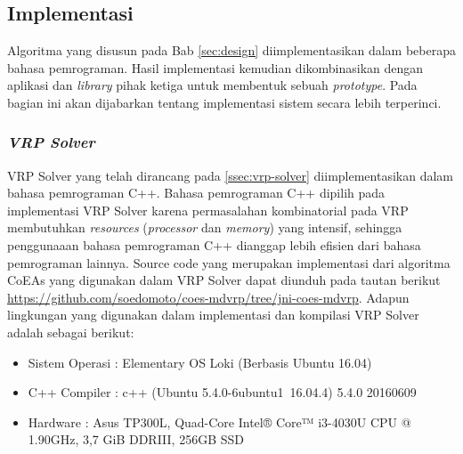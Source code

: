 \chapter{\babLima}


\section{Implementasi}
\label{sec:implementation}
Algoritma yang disusun pada Bab \ref{sec:design} diimplementasikan dalam beberapa bahasa pemrograman. Hasil implementasi kemudian dikombinasikan dengan aplikasi dan \textit{library} pihak ketiga untuk membentuk sebuah \textit{prototype}. Pada bagian ini akan dijabarkan tentang implementasi sistem secara lebih terperinci.


\subsection{\textit{VRP Solver}}
VRP Solver yang telah dirancang pada \autoref{ssec:vrp-solver} diimplementasikan dalam bahasa pemrograman C++. Bahasa pemrograman C++ dipilih pada implementasi VRP Solver karena permasalahan kombinatorial pada VRP membutuhkan \textit{resources} (\textit{processor} dan \textit{memory}) yang intensif, sehingga penggunaaan bahasa pemrograman C++ dianggap lebih efisien dari bahasa pemrograman lainnya. Source code yang merupakan implementasi dari algoritma CoEAs yang digunakan dalam VRP Solver dapat diunduh pada tautan berikut  \url{https://github.com/soedomoto/coes-mdvrp/tree/jni-coes-mdvrp}. Adapun lingkungan yang digunakan dalam implementasi dan kompilasi VRP Solver adalah sebagai berikut:


\begin{itemize}
\item Sistem Operasi		: Elementary OS Loki (Berbasis Ubuntu 16.04)
\item C++ Compiler			: c++ (Ubuntu 5.4.0-6ubuntu1~16.04.4) 5.4.0 20160609
\item Hardware				: Asus TP300L, Quad-Core Intel® Core™ i3-4030U CPU @ 1.90GHz, 3,7 GiB DDRIII, 256GB SSD
\end{itemize}


